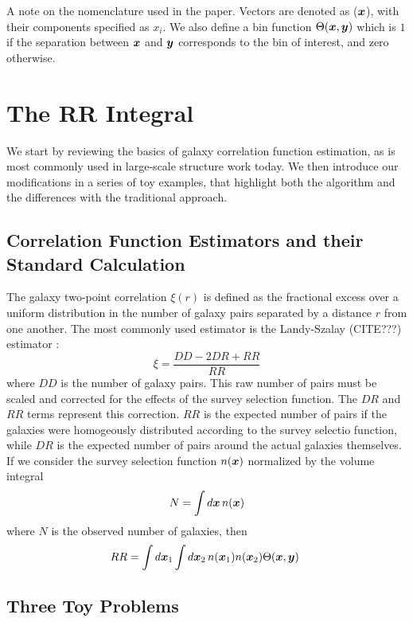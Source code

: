 \documentclass[usenatbib]{mn2e}
\begin{document}
A note on the nomenclature used in the paper. Vectors are denoted as (${\bm x}$),
with their components specified as $x_{i}$. We also define a bin function
$\Theta({\bm x},{\bm y})$ which is $1$ if the separation between ${\bm x}$ and ${\bm y}$
corresponds to the bin of interest, and zero otherwise. 

\section{The RR Integral}
\label{sec:RR}

We start by reviewing the basics of galaxy correlation function estimation, as 
is most commonly used in large-scale structure work today. We then introduce 
our modifications in a series of toy examples, that highlight both the algorithm
and the differences with the traditional approach.

\subsection{Correlation Function Estimators and their Standard Calculation}

The galaxy two-point correlation $\xi(r)$ is defined as the fractional excess
over a uniform distribution in the number of galaxy pairs separated by a
distance $r$ from one another. The most commonly used estimator is the
Landy-Szalay (CITE???) estimator :
\begin{equation}
\xi = \frac{DD - 2 DR + RR}{RR}
\end{equation}
where $DD$ is the number of galaxy pairs. This raw number of pairs must be
scaled and corrected for the effects of the survey selection function. The $DR$
and $RR$ terms represent this correction. $RR$ is the expected number of pairs
if the galaxies were homogeously distributed according to the survey selectio
function, while $DR$ is the expected number of pairs around the actual galaxies
themselves. If we consider the survey selection function $n({\bm x})$ normalized
by the volume integral
\begin{equation}
N = \int d{\bm x}\,n({\bm x})
\end{equation}
where $N$ is the observed number of galaxies, then 
\begin{equation}
RR = \int d{\bm x}_1  \int d{\bm x}_2 \,n({\bm x}_1) n({\bm x}_2) \Theta({\bm x},{\bm y}) \,\,
\end{equation}


\subsection{Three Toy Problems}
\end{document}
